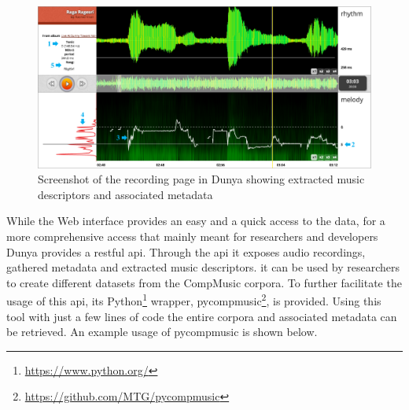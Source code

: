 \begin{figure}
	\begin{center}
		\includegraphics[width=\figSizeHundred]{ch08_applications/figures/dunyaScreenshot.pdf}
		\end{center}
		\caption{Screenshot of the recording page in Dunya showing extracted music descriptors and associated metadata}
		\label{fig:dunya_recording}
\end{figure}

While the Web interface provides an easy and a quick access to the data, for a more comprehensive access that mainly meant for researchers and developers Dunya provides a restful \gls{api}. Through the \gls{api} it exposes audio recordings, gathered metadata and extracted music descriptors. it can be used by researchers to create different datasets from the CompMusic corpora. To further facilitate the usage of this \gls{api}, its Python\footnote{\url{https://www.python.org/}} wrapper, \gls{pycompmusic}\footnote{\url{https://github.com/MTG/pycompmusic}}, is provided. Using this tool with just a few lines of code the entire corpora and associated metadata can be retrieved. An example usage of \gls{pycompmusic} is shown below.

%
%
%
%
%

